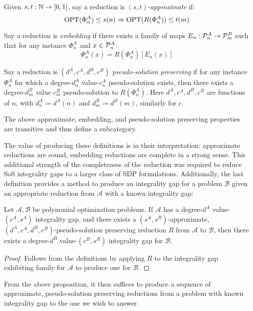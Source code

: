\documentclass[runningheads,a4paper,english]{llncs}[2022/01/12]
\begin{document}
\begin{definition}
  Given $s, t : \mathbb{N} \to [0,1]$, say a reduction is $(s, t)$\emph{-approximate} if:
  \[\operatorname{OPT}(\Phi_n^A) \le s(n) \Rightarrow \operatorname{OPT}(R(\Phi_n^A)) \le t(m)\]
\end{definition}
\begin{definition}
  Say a reduction is \emph{embedding} if there exists a family of maps $E_n : \mathcal{P}_n^A \to \mathcal{P}_m^B$ such that for any instance $\Phi_n^A$ and $x \in \mathcal{P}_n^A$:
  \[\Phi_n^A(x) = R(\Phi_n^A)[E_n(x)]\]
\end{definition}
\begin{definition}
  Say a reduction is $(d^A, c^A, d^B, c^B)$ \emph{pseudo-solution preserving} if for any instance $\Phi_n^A$ for which a degree-$d_n^A$ value-$c_n^A$ pseudo-solution exists, then there exists a degree-$d_m^B$ value $c_m^B$ pseudo-solution to $R(\Phi_n^A)$. Here $d^A, c^A, d^B, c^B$ are functions of $n$, with $d_n^A \coloneq d^A(n)$ and $d_m^B \coloneq d^B(m)$, similarly for $c$.
\end{definition}
\begin{proposition}
  The above approximate, embedding, and pseudo-solution preserving properties are transitive and thus define a subcategory.
\end{proposition}
The value of producing these definitions is in their interpretation: approximate reductions are sound, embedding reductions are complete in a strong sense.
This additional strength of the completeness of the reduction was required to reduce SoS integrality gaps to a larger class of SDP formulations.
Additionally, the last definition provides a method to produce an integrality gap for a problem $\mathscr{B}$ given an appropriate reduction from $\mathscr{A}$ with a known integrality gap:
\begin{proposition}\label{prop:2}
  Let $\mathscr{A}, \mathscr{B}$ be polynomial optimization problems. If $\mathscr{A}$ has a degree-$d^A$ value-$(c^A, s^A)$ integrality gap, and there exists a $(s^A, s^B)$-approximate, $(d^A, c^A, d^B, c^B)$-pseudo-solution preserving reduction $R$ from $\mathscr{A}$ to $\mathscr{B}$, then there exists a degree-$d^B$ value-$(c^B, s^B)$ integrality gap for $\mathscr{B}$.
\end{proposition}
\begin{proof}
  Follows from the definitions by applying $R$ to the integrality gap exhibiting family for $\mathscr{A}$ to produce one for $\mathscr{B}$.
\end{proof}
From the above proposition, it then suffices to produce a sequence of approximate, pseudo-solution preserving reductions from a problem with known integrality gap to the one we wish to answer.
\end{document}
